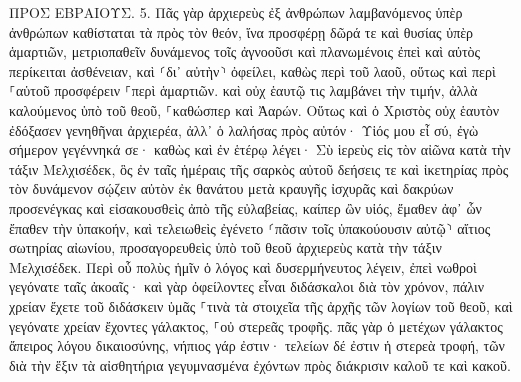 \documentclass[twoside, 9pt]{extreport}
\begin{document}
ΠΡΟΣ ΕΒΡΑΙΟΥΣ.
5.
Πᾶς γὰρ ἀρχιερεὺς ἐξ ἀνθρώπων λαμβανόμενος ὑπὲρ ἀνθρώπων καθίσταται τὰ πρὸς τὸν θεόν, ἵνα προσφέρῃ δῶρά τε καὶ θυσίας ὑπὲρ ἁμαρτιῶν, 
μετριοπαθεῖν δυνάμενος τοῖς ἀγνοοῦσι καὶ πλανωμένοις ἐπεὶ καὶ αὐτὸς περίκειται ἀσθένειαν, 
καὶ ⸂δι᾽ αὐτὴν⸃ ὀφείλει, καθὼς περὶ τοῦ λαοῦ, οὕτως καὶ περὶ ⸀αὑτοῦ προσφέρειν ⸀περὶ ἁμαρτιῶν. 
καὶ οὐχ ἑαυτῷ τις λαμβάνει τὴν τιμήν, ἀλλὰ καλούμενος ὑπὸ τοῦ θεοῦ, ⸀καθώσπερ καὶ Ἀαρών. 
Οὕτως καὶ ὁ Χριστὸς οὐχ ἑαυτὸν ἐδόξασεν γενηθῆναι ἀρχιερέα, ἀλλ᾽ ὁ λαλήσας πρὸς αὐτόν· Υἱός μου εἶ σύ, ἐγὼ σήμερον γεγέννηκά σε· 
καθὼς καὶ ἐν ἑτέρῳ λέγει· Σὺ ἱερεὺς εἰς τὸν αἰῶνα κατὰ τὴν τάξιν Μελχισέδεκ, 
ὃς ἐν ταῖς ἡμέραις τῆς σαρκὸς αὐτοῦ δεήσεις τε καὶ ἱκετηρίας πρὸς τὸν δυνάμενον σῴζειν αὐτὸν ἐκ θανάτου μετὰ κραυγῆς ἰσχυρᾶς καὶ δακρύων προσενέγκας καὶ εἰσακουσθεὶς ἀπὸ τῆς εὐλαβείας, 
καίπερ ὢν υἱός, ἔμαθεν ἀφ᾽ ὧν ἔπαθεν τὴν ὑπακοήν, 
καὶ τελειωθεὶς ἐγένετο ⸂πᾶσιν τοῖς ὑπακούουσιν αὐτῷ⸃ αἴτιος σωτηρίας αἰωνίου, 
προσαγορευθεὶς ὑπὸ τοῦ θεοῦ ἀρχιερεὺς κατὰ τὴν τάξιν Μελχισέδεκ. 
Περὶ οὗ πολὺς ἡμῖν ὁ λόγος καὶ δυσερμήνευτος λέγειν, ἐπεὶ νωθροὶ γεγόνατε ταῖς ἀκοαῖς· 
καὶ γὰρ ὀφείλοντες εἶναι διδάσκαλοι διὰ τὸν χρόνον, πάλιν χρείαν ἔχετε τοῦ διδάσκειν ὑμᾶς ⸀τινὰ τὰ στοιχεῖα τῆς ἀρχῆς τῶν λογίων τοῦ θεοῦ, καὶ γεγόνατε χρείαν ἔχοντες γάλακτος, ⸀οὐ στερεᾶς τροφῆς. 
πᾶς γὰρ ὁ μετέχων γάλακτος ἄπειρος λόγου δικαιοσύνης, νήπιος γάρ ἐστιν· 
τελείων δέ ἐστιν ἡ στερεὰ τροφή, τῶν διὰ τὴν ἕξιν τὰ αἰσθητήρια γεγυμνασμένα ἐχόντων πρὸς διάκρισιν καλοῦ τε καὶ κακοῦ. 
\end{document}
